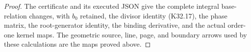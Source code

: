 \begin{proof}
The certificate
 and its
executed JSON give the complete integral
base-relation changes, with $b_0$ retained,
the divisor identity (K32.17), the phase
matrix, the root-generator identity, the
binding derivative, and the actual order-one
kernel maps. The geometric source, line,
page, and boundary arrows used by these
calculations are the maps proved above.
\end{proof}
